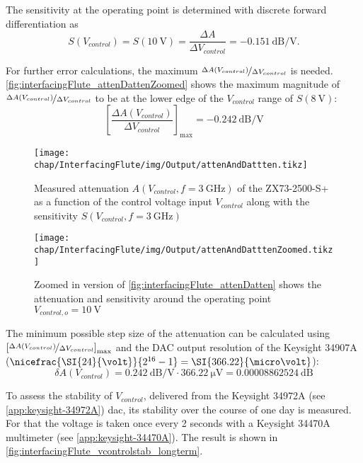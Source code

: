 The sensitivity at the operating point is determined with discrete forward differentiation as
\begin{equation}
S(V_{control})=S(\SI{10}{\volt})=\frac{\Delta A}{\Delta V_{control}} = \SI{-0.151}{\dB\per\volt}.
\end{equation}

For further error calculations, the maximum $\nicefrac{\Delta A(V_{control})}{\Delta V_{control}}$ is needed. \autoref{fig:interfacingFlute_attenDattenZoomed} shows the maximum magnitude of $\nicefrac{\Delta A(V_{control})}{\Delta V_{control}}$ to be at the lower edge of the $V_{control}$ range of $S(\SI{8}{\volt})$:
\begin{equation}
\left[\frac{\Delta A(V_{control})}{\Delta V_{control}}\right]_{\text{max}}=\SI{-0.242}{\dB\per\volt}
\end{equation}

\begin{figure}[tb]
	\centering
	\texttt{[image: chap/InterfacingFlute/img/Output/attenAndDattten.tikz]}
	\caption{Measured attenuation $A(V_{control},f=\SI{3}{\GHz})$ of the ZX73-2500-S+ as a function of the control voltage input $V_{control}$ along with the sensitivity $S(V_{control},f=\SI{3}{\GHz})$}
	\label{fig:interfacingFlute_attenDatten}
\end{figure}

\begin{figure}[tb]
	\centering
	\texttt{[image: chap/InterfacingFlute/img/Output/attenAndDatttenZoomed.tikz]}
	\caption{Zoomed in version of \autoref{fig:interfacingFlute_attenDatten} shows the attenuation and sensitivity around the operating point $V_{control,o}=\SI{10}{\volt}$}
	\label{fig:interfacingFlute_attenDattenZoomed}
\end{figure}

The minimum possible step size of the attenuation can be calculated using $\left[\nicefrac{\Delta A(V_{control})}{\Delta V_{control}}\right]_{\text{max}}$ and the DAC output resolution of the Keysight 34907A ($\nicefrac{\SI{24}{\volt}}{2^{16}-1}=\SI{366.22}{\micro\volt}$):
\begin{equation}
\delta A(V_{control}) = \SI{0.242}{\dB\per\volt} \cdot \SI{366.22}{\micro\volt} = \SI{0.00008862524}{\dB}
\end{equation}

To assess the stability of $V_{control}$, delivered from the Keysight 34972A (see \autoref{app:keysight-34972A}) \gls{dac}, its stability over the course of one day is measured. For that the voltage is taken once every 2 seconds with a Keysight 34470A multimeter (see \autoref{app:keysight-34470A}). The result is shown in \autoref{fig:interfacingFlute_vcontrolstab_longterm}.

